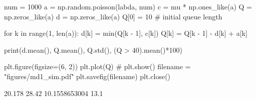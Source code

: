 
num = 1000
a = np.random.poisson(labda, num)
c = mu * np.ones_like(a)
Q = np.zeros_like(a)
d = np.zeros_like(a)
Q[0] = 10  # initial queue length

for k in range(1, len(a)):
    d[k] = min(Q[k - 1], c[k])
    Q[k] = Q[k - 1] - d[k] + a[k]

print(d.mean(), Q.mean(), Q.std(), (Q > 40).mean()*100)

plt.figure(figsize=(6, 2))
plt.plot(Q)
# plt.show()
filename = "figures/md1_sim.pdf"
plt.savefig(filename)
plt.close()

20.178 28.42 10.1558653004 13.1

